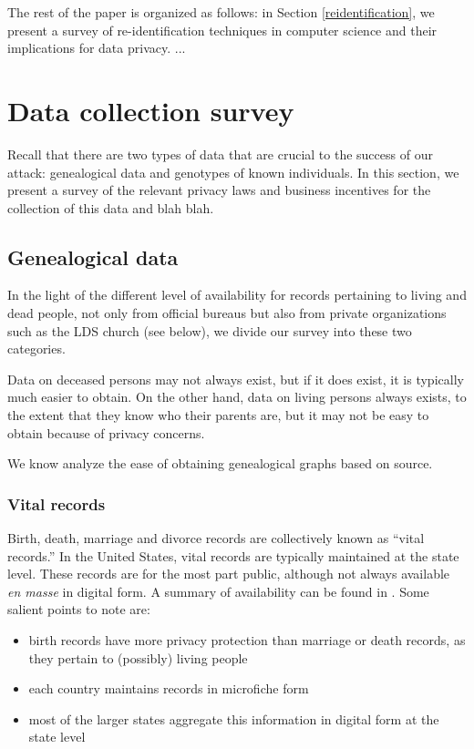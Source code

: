 \documentclass{article}
\begin{document}
The rest of the paper is organized as follows: in Section \ref{reidentification}, we present a survey of re-identification techniques in computer science and their implications for data privacy. ...




\section{Data collection survey}

Recall that there are two types of data that are crucial to the success of our attack: genealogical data and  genotypes of known individuals. In this section, we present a survey of the relevant privacy laws and business incentives for the collection of this data and blah blah.


\subsection{Genealogical data}
In the light of the different level of availability for records pertaining to living and dead people, not only from official bureaus but also from private organizations such as the LDS church (see below), we divide our survey into these two categories.

Data on deceased persons may not always exist, but if it does exist, it is typically much easier to obtain. On the other hand, data on living persons always exists, to the extent that they know who their parents are, but it may not be easy to obtain because of privacy concerns.

We know analyze the ease of obtaining genealogical graphs based on source.

\subsubsection{Vital records}

Birth, death, marriage  and divorce records are collectively known as ``vital records.'' In the United States, vital records are typically maintained at the state level. These records are for the most part public, although not always available {\em en masse} in digital form. A summary of availability can be found in \cite{messing}. Some salient points to note are:
\begin{itemize}
\item
birth records have more privacy protection than marriage or death records, as they pertain to (possibly) living people
\item
each country maintains records in microfiche form
\item
most of the larger states aggregate this information in digital form at the state level
\end{itemize}
\end{document}
